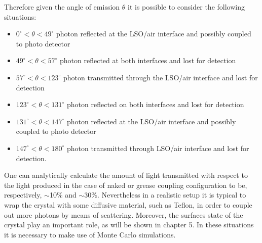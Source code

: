 Therefore given the angle of emission $\theta$ it is possible to consider the following situations:
\begin{itemize}
\item $0^{\circ}<\theta<49^{\circ}$ photon reflected at the LSO/air interface and possibly coupled to photo detector
\item $49^{\circ}<\theta<57^{\circ}$ photon reflected at both interfaces and lost for detection
\item $57^{\circ}<\theta<123^{\circ}$ photon transmitted through the LSO/air interface and lost for detection
\item $123^{\circ}<\theta<131^{\circ}$ photon reflected on both interfaces and lost for detection
\item $131^{\circ}<\theta<147^{\circ}$ photon reflected at the LSO/air interface and possibly coupled to photo detector
\item $147^{\circ}<\theta<180^{\circ}$ photon transmitted through LSO/air interface and lost for detection.
\end{itemize}
One can analytically calculate the amount of light transmitted with respect to the light produced in the case of naked or grease coupling configuration to be, respectively,  $\sim$10$\%$ and $\sim$30$\%$.
Nevertheless in a realistic setup it is typical to wrap the crystal with some diffusive material, such as Teflon, in order to couple out more photons by means of scattering. Moreover, the surfaces state of the crystal play an important role, as will be shown in chapter 5. In these situations it is necessary to make use of Monte Carlo simulations.
